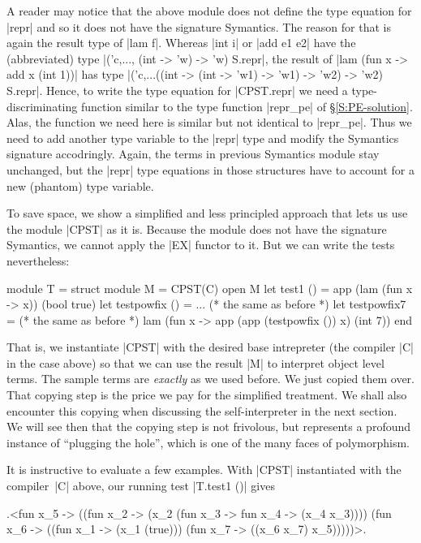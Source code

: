 \documentclass[preprint]{sigplanconf}
\begin{document}
A reader may notice that the above module does not define the type
equation for |repr| and so it does not have the signature Symantics.
The reason for that is again the result type of |lam f|. Whereas
|int i| or |add e1 e2| have the (abbreviated) 
type |('c,..., (int -> 'w) -> 'w) S.repr|,
the result of |lam (fun x -> add x (int 1))| has type
|('c,...((int -> (int -> 'w1) -> 'w1) -> 'w2) -> 'w2) S.repr|. 
Hence, to write the type equation for |CPST.repr| we need a 
type-discriminating
function similar to the type function |repr_pe| of
\S\ref{S:PE-solution}. Alas, the function we need here is
similar but not identical to |repr_pe|. Thus we need to add 
another type variable to the |repr| type and modify the Symantics
signature accodringly. Again, the terms in previous Symantics module
stay unchanged, but the |repr| type equations in those structures have to
account for a new (phantom) type variable.

To save space, we show a simplified and less principled approach that
lets us use the module |CPST| as it is. Because the module does not
have the signature Symantics, we cannot apply the |EX| functor to it.
But we can write the tests nevertheless:
\begin{code}
module T = struct
 module M = CPST(C)
 open M
 let test1 () = app (lam (fun x -> x)) (bool true)
 let testpowfix () = ... (* the same as before *)
 let testpowfix7 = (* the same as before *)
    lam (fun x -> app (app (testpowfix ()) x) (int 7))
end
\end{code}
That is, we instantiate |CPST| with the desired base intrepreter (the
compiler |C| in the case above) so that we can use the result |M| to
interpret object level terms. The sample terms are \emph{exactly}
as we used before. We just copied them over. That copying step is the
price we pay for the simplified treatment. We shall also encounter this
copying when discussing the self-interpreter in the next section. We
will see then that the copying step is not frivolous, but represents
a profound instance of 
``plugging the hole'', which is one of the many faces of polymorphism.

It is instructive to evaluate a few examples. With 
|CPST| instantiated with the compiler~|C| above, our
running test |T.test1 ()| gives
\begin{code}
.<fun x_5 -> ((fun x_2 -> 
        (x_2 (fun x_3 -> fun x_4 -> (x_4 x_3))))
        (fun x_6 -> ((fun x_1 -> (x_1 (true))) 
        (fun x_7 -> ((x_6 x_7) x_5)))))>.
\end{code}
\end{document}
